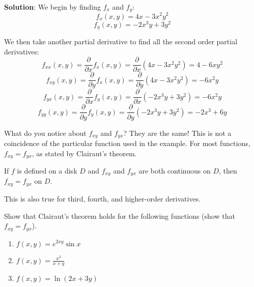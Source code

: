 \textbf{Solution}: We begin by finding $f_x$ and $f_y$:
$$f_x(x, y) = 4x - 3x^2y^2$$
$$f_y(x, y) = -2x^3y + 3y^2$$

We then take another partial derivative to find all the second order partial 
derivatives:
$$f_{xx}(x, y) = \frac{\partial}{\partial x}f_x(x, y) = \frac{\partial}{
\partial x} \left( 4x - 3x^2y^2 \right) = 4 - 6xy^2$$
$$f_{xy}(x, y) = \frac{\partial}{\partial y}f_x(x, y) = \frac{\partial}{
\partial y} \left( 4x - 3x^2y^2 \right) = -6x^2y$$
$$f_{yx}(x, y) = \frac{\partial}{\partial x}f_y(x, y) = \frac{\partial}{
\partial x} \left( -2x^3y + 3y^2 \right) = -6x^2y$$
$$f_{yy}(x, y) = \frac{\partial}{\partial y}f_y(x, y) = \frac{\partial}{
\partial y} \left( -2x^3y + 3y^2 \right) = -2x^3 + 6y$$

What do you notice about $f_{xy}$ and $f_{yx}$? They are the same! This is not 
a coincidence of the particular function used in the example. For most 
functions, $f_{xy} = f_{yx}$, as stated by Clairaut's theorem.

\begin{mdframed}[style = important, frametitle = {Clairaut's Theorem}]
If $f$ is defined on a disk $D$ and $f_{xy}$ and $f_{yx}$ are both continuous 
on $D$, then $f_{xy} = f_{yx}$ on $D$.
\end{mdframed}

This is also true for third, fourth, and higher-order derivatives. 

\begin{Exercise}[title = {Clairaut's Theorem}, label = clairaut]
Show that Clairaut's theorem holds for the following functions (show that 
$f_{xy} = f_{yx}$). 
\begin{enumerate}
    \item $f(x, y) = e^{2xy} \sin{x}$
    \item $f(x, y) = \frac{x^2}{x + y}$
    \item $f(x, y) = \ln{\left( 2x + 3y \right)}$
\end{enumerate}
\end{Exercise}

